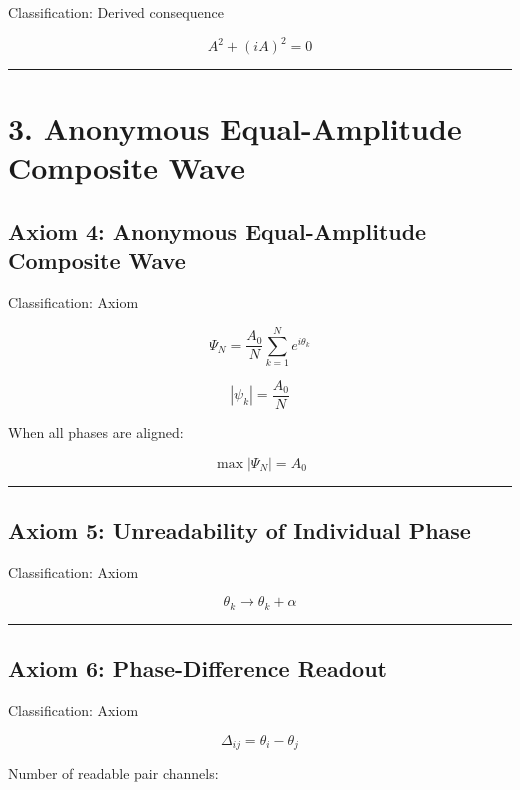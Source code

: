 \documentclass[
  a4paper,
]{article}
\begin{document}
Classification: Derived consequence

\[
A^2+(iA)^2=0
\]

\begin{center}\rule{0.5\linewidth}{0.5pt}\end{center}

\section{3. Anonymous Equal-Amplitude Composite
Wave}\label{anonymous-equal-amplitude-composite-wave}

\subsection{Axiom 4: Anonymous Equal-Amplitude Composite
Wave}\label{axiom-4-anonymous-equal-amplitude-composite-wave}

Classification: Axiom

\[
\Psi_N=\frac{A_0}{N}\sum_{k=1}^{N}e^{i\theta_k}
\]

\[
|\psi_k|=\frac{A_0}{N}
\]

When all phases are aligned:

\[
\max|\Psi_N|=A_0
\]

\begin{center}\rule{0.5\linewidth}{0.5pt}\end{center}

\subsection{Axiom 5: Unreadability of Individual
Phase}\label{axiom-5-unreadability-of-individual-phase}

Classification: Axiom

\[
\theta_k\rightarrow\theta_k+\alpha
\]

\begin{center}\rule{0.5\linewidth}{0.5pt}\end{center}

\subsection{Axiom 6: Phase-Difference
Readout}\label{axiom-6-phase-difference-readout}

Classification: Axiom

\[
\Delta_{ij}=\theta_i-\theta_j
\]

Number of readable pair channels:
\end{document}
